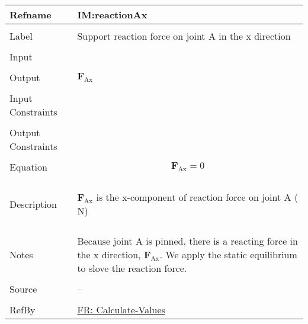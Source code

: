 \documentclass[12pt]{article}
\begin{document}
\vspace{\baselineskip}
\noindent
\begin{minipage}{\textwidth}
\begin{tabular}{>{\raggedright}p{}>{\raggedright\arraybackslash}p{}}
\toprule \textbf{Refname} & \textbf{IM:reactionAx}
\label{IM:reactionAx}
\\ \midrule \\
Label & Support reaction force on joint A in the x direction
        
\\ \midrule \\
Input & 
\\ \midrule \\
Output & ${\mathbf{F}_{\text{Ax}}}$
         
\\ \midrule \\
Input Constraints & 
\\ \midrule \\
Output Constraints & 
\\ \midrule \\
Equation & \begin{displaymath}
           {\mathbf{F}_{\text{Ax}}}=0
           \end{displaymath}
\\ \midrule \\
Description & \begin{symbDescription}
              \item{${\mathbf{F}_{\text{Ax}}}$ is the x-component of reaction force on joint A (${\text{N}}$)}
              \end{symbDescription}
\\ \midrule \\
Notes & Because joint A is pinned, there is a reacting force in the x direction, ${\mathbf{F}_{\text{Ax}}}$. We apply the static equilibrium to slove the reaction force.
        
\\ \midrule \\
Source & --
         
\\ \midrule \\
RefBy & \hyperref[calcValues]{FR: Calculate-Values}
        
\\ \bottomrule
\end{tabular}
\end{minipage}
\end{document}
